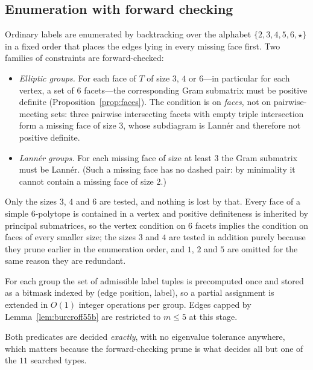 \documentclass[11pt,reqno]{amsart}
\theoremstyle{plain}
\theoremstyle{definition}
\newcommand{\NumRequired}{11}
\begin{document}
\subsection{Enumeration with forward checking}
Ordinary labels are enumerated by backtracking over the alphabet
$\{2,3,4,5,6,\star\}$ in a fixed order that places the edges lying in every
missing face first. Two families of constraints are forward-checked:

\begin{itemize}
\item \emph{Elliptic groups.} For each face of $T$ of size $3$, $4$ or $6$---in
      particular for each vertex, a set of $6$ facets---the corresponding Gram
      submatrix must be positive definite (Proposition~\ref{prop:faces}). The
      condition is on \emph{faces}, not on pairwise-meeting sets: three pairwise
      intersecting facets with empty triple intersection form a missing face of
      size $3$, whose subdiagram is Lann\'er and therefore not positive definite.
\item \emph{Lann\'er groups.} For each missing face of size at least $3$ the Gram
      submatrix must be Lann\'er. (Such a missing face has no dashed pair: by
      minimality it cannot contain a missing face of size $2$.)
\end{itemize}
Only the sizes $3$, $4$ and $6$ are tested, and nothing is lost by that. Every face
of a simple $6$-polytope is contained in a vertex and positive definiteness is
inherited by principal submatrices, so the vertex condition on $6$ facets implies the
condition on faces of every smaller size; the sizes $3$ and $4$ are tested in
addition purely because they prune earlier in the enumeration order, and $1$, $2$ and
$5$ are omitted for the same reason they are redundant.

For each group the set of admissible label tuples is precomputed once and stored
as a bitmask indexed by (edge position, label), so a partial assignment is
extended in $O(1)$ integer operations per group. Edges capped by
Lemma~\ref{lem:burcroff55b} are restricted to $m\le5$ at this stage.

Both predicates are decided \emph{exactly}, with no eigenvalue tolerance anywhere,
which matters because the forward-checking prune is what decides all but one of the
$\NumRequired$ searched types.
\end{document}
